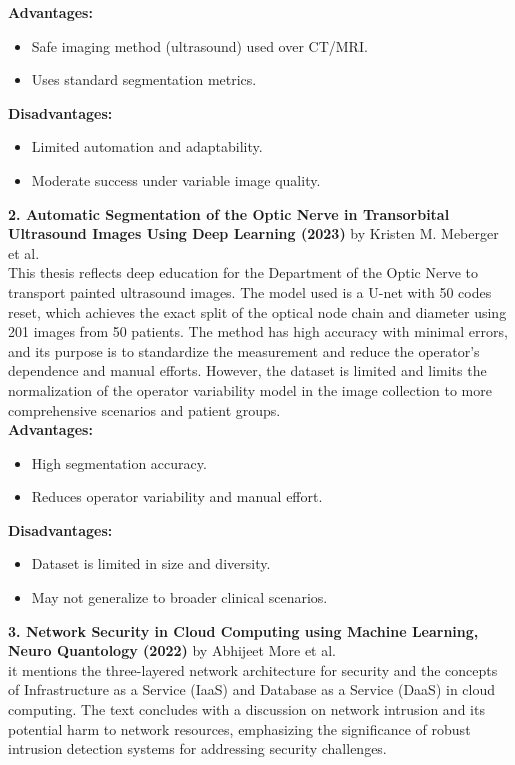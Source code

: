 \documentclass[12pt]{article}
\begin{document}
\textbf{Advantages:}
\begin{itemize}
    \item Safe imaging method (ultrasound) used over CT/MRI.
    \item Uses standard segmentation metrics.
\end{itemize}

\textbf{Disadvantages:}
\begin{itemize}
    \item Limited automation and adaptability.
    \item Moderate success under variable image quality.
\end{itemize}

\vspace{10pt}

\noindent \textbf{2. Automatic Segmentation of the Optic Nerve in Transorbital Ultrasound Images Using Deep Learning (2023)} by Kristen M. Meberger et al.\\
This thesis reflects deep education for the Department of the Optic Nerve to transport painted ultrasound images. The model used is a U-net
with 50 codes reset, which achieves the exact split of the optical node chain and diameter using 201
images from 50 patients. The method has high accuracy with minimal errors, and its purpose is to
standardize the measurement and reduce the operator’s dependence and manual efforts. However,
the dataset is limited and limits the normalization of the operator variability model in the image
collection to more comprehensive scenarios and patient groups.\\

\newpage
\textbf{Advantages:}
\begin{itemize}
    \item High segmentation accuracy.
    \item Reduces operator variability and manual effort.
\end{itemize}

\textbf{Disadvantages:}
\begin{itemize}
    \item Dataset is limited in size and diversity.
    \item May not generalize to broader clinical scenarios.
\end{itemize}

\vspace{10pt}

\noindent \textbf{3. Network Security in Cloud Computing using Machine Learning, Neuro Quantology  (2022)} by Abhijeet More et al.\\
it mentions the three-layered network architecture for security and the concepts of Infrastructure as a Service (IaaS) and Database as a Service (DaaS) in cloud computing.
The text concludes with a discussion on network intrusion and its potential harm to network resources, emphasizing the significance of robust intrusion detection systems for addressing security
challenges.\\
\end{document}
